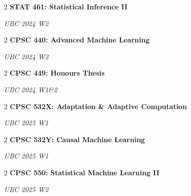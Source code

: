 \documentclass[10pt, letterpaper]{article}
\newenvironment{twocolentry}[2][]{
    \onecolentry
    \def\secondColumn{#2}
    \setcolumnwidth{\fill, 4.5 cm}
    \begin{paracol}{2}
}{
    \switchcolumn \raggedleft \secondColumn
    \end{paracol}
    \endonecolentry
} %
\begin{document}
        \begin{twocolentry}
            {%
            \textit{UBC 2024 W2} %
            }{%
            \textbf{STAT 461: Statistical Inference II}  %
            }
        \end{twocolentry}


        \vspace{0.2 cm}

        \begin{twocolentry}
            {%
            \textit{UBC 2024 W2} %
            }{%
            \textbf{CPSC 440: Advanced Machine Learning}  %
            }
        \end{twocolentry}


        \vspace{0.2 cm}

        \begin{twocolentry}
            {%
            \textit{UBC 2024 W1\&2} %
            }{%
            \textbf{CPSC 449: Honours Thesis}  %
            }
        \end{twocolentry}


        \vspace{0.2 cm}

        \begin{twocolentry}
            {%
            \textit{UBC 2025 W1} %
            }{%
            \textbf{CPSC 532X: Adaptation \& Adaptive Computation}  %
            }
        \end{twocolentry}


        \vspace{0.2 cm}

        \begin{twocolentry}
            {%
            \textit{UBC 2025 W1} %
            }{%
            \textbf{CPSC 532Y: Causal Machine Learning}  %
            }
        \end{twocolentry}


        \vspace{0.2 cm}

        \begin{twocolentry}
            {%
            \textit{UBC 2025 W2} %
            }{%
            \textbf{CPSC 550: Statistical Machine Learning II}  %
            }
        \end{twocolentry}
\end{document}

